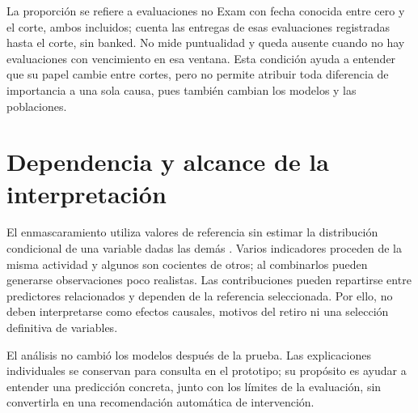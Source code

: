La proporción se refiere a evaluaciones no Exam con fecha conocida entre cero y el corte, ambos incluidos; cuenta las entregas de esas evaluaciones registradas hasta el corte, sin banked. No mide puntualidad y queda ausente cuando no hay evaluaciones con vencimiento en esa ventana. Esta condición ayuda a entender que su papel cambie entre cortes, pero no permite atribuir toda diferencia de importancia a una sola causa, pues también cambian los modelos y las poblaciones.

\section{Dependencia y alcance de la interpretación}
El enmascaramiento utiliza valores de referencia sin estimar la distribución condicional de una variable dadas las demás \cite{modelosshapindependent2026}. Varios indicadores proceden de la misma actividad y algunos son cocientes de otros; al combinarlos pueden generarse observaciones poco realistas. Las contribuciones pueden repartirse entre predictores relacionados y dependen de la referencia seleccionada. Por ello, no deben interpretarse como efectos causales, motivos del retiro ni una selección definitiva de variables.

El análisis no cambió los modelos después de la prueba. Las explicaciones individuales se conservan para consulta en el prototipo; su propósito es ayudar a entender una predicción concreta, junto con los límites de la evaluación, sin convertirla en una recomendación automática de intervención.
